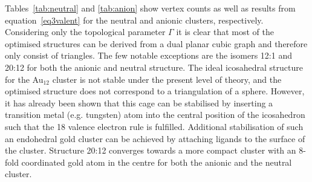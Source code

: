 Tables~\ref{tab:neutral} and \ref{tab:anion} show vertex counts as well as
results from equation~\eqref{eq3valent} for the neutral and anionic clusters,
respectively. Considering only the topological parameter $\Gamma$ it is clear
that most of the optimised structures can be derived from a dual planar cubic
graph and therefore only consist of triangles. The few notable exceptions are
the isomers 12:1 and 20:12 for both the anionic and neutral structure. The ideal
icosahedral structure for the Au$_{12}$ cluster is not stable under the present
level of theory, and the optimised structure does not correspond to a
triangulation of a sphere. However, it has already been shown that this cage can
be stabilised by inserting a transition metal (e.g. tungsten) atom into the
central position of the icosahedron such that the 18 valence electron rule is
fulfilled.\autocite{Pyykko_IcosahedralWAu12Predicted_2002,Autschbach_PropertiesWAu12_2004}
Additional stabilisation of such an endohedral gold cluster can be achieved by
attaching ligands to the surface of the cluster.\autocite{Laupp-1994} Structure
20:12 converges towards a more compact cluster with an 8-fold coordinated gold
atom in the centre for both the anionic and the neutral cluster. 
%
